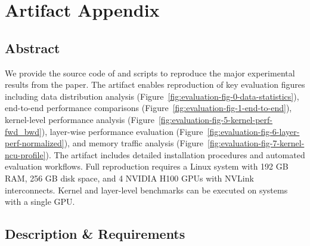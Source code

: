 %

\appendix
\section{Artifact Appendix} 

\subsection{Abstract}

We provide the source code of \Name and scripts to reproduce the major experimental results from the  paper.
The artifact enables reproduction of key evaluation figures including data distribution analysis (Figure~\ref{fig:evaluation-fig-0-data-statistics}), end-to-end performance comparisons (Figure~\ref{fig:evaluation-fig-1-end-to-end}), kernel-level performance analysis (Figure~\ref{fig:evaluation-fig-5-kernel-perf-fwd_bwd}), layer-wise performance evaluation (Figure~\ref{fig:evaluation-fig-6-layer-perf-normalized}), and memory traffic analysis (Figure~\ref{fig:evaluation-fig-7-kernel-ncu-profile}).
The artifact includes detailed installation procedures and automated evaluation workflows.
Full reproduction requires a Linux system with 192 GB RAM, 256 GB disk space, and 4 NVIDIA H100 GPUs with NVLink interconnects.
Kernel and layer-level benchmarks can be executed on systems with a single GPU.

\subsection{Description \& Requirements}


